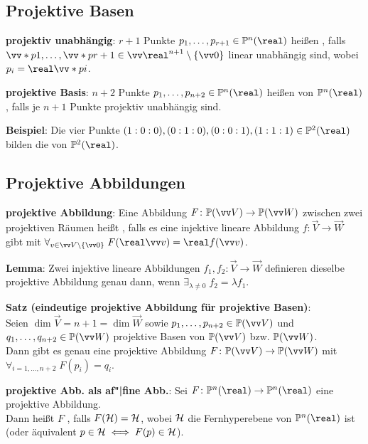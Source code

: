 \subsection{%
    Projektive Basen%
}

\textbf{projektiv unabhängig}:
$r+1$ Punkte $p_1, \dotsc, p_{r+1} \in \PP^n(\real)$ heißen , falls
$\vec*{p}{1}, \dotsc, \vec*{p}{r+1} \in \vec{\real}^{n+1} \setminus \{\vec{0}\}$ linear unabhängig
sind, wobei $p_i = \real\vec*{p}{i}$.

\textbf{projektive Basis}:
$n+2$ Punkte $p_1, \dotsc, p_{n+2} \in \PP^n(\real)$ heißen
von $\PP^n(\real)$, falls je $n+1$ Punkte projektiv unabhängig sind.

\textbf{Beispiel}:
Die vier Punkte $(1:0:0), (0:1:0), (0:0:1), (1:1:1) \in \PP^2(\real)$ bilden die
 von $\PP^2(\real)$.

\pagebreak

\subsection{%
    Projektive Abbildungen%
}

\textbf{projektive Abbildung}:
Eine Abbildung $F\colon \PP(\vec{V}) \to \PP(\vec{W})$ zwischen zwei projektiven Räumen heißt
, falls es eine injektive lineare Abbildung
$f\colon \vec{V} \to \vec{W}$ gibt mit
$\forall_{v \in \vec{V} \setminus \{\vec{0}\}}\; F(\real\vec{v}) = \real f(\vec{v})$.

\textbf{Lemma}:
Zwei injektive lineare Abbildungen $f_1, f_2\colon \vec{V} \to \vec{W}$ definieren dieselbe
projektive Abbildung genau dann, wenn $\exists_{\lambda\not=0}\; f_2 = \lambda f_1$.

\textbf{Satz (eindeutige projektive Abbildung für projektive Basen)}:\\
Seien $\dim \vec{V} = n + 1 = \dim \vec{W}$ sowie $p_1, \dotsc, p_{n+2} \in \PP(\vec{V})$ und
$q_1, \dotsc, q_{n+2} \in \PP(\vec{W})$ projektive Basen von $\PP(\vec{V})$ bzw. $\PP(\vec{W})$.\\
Dann gibt es genau eine projektive Abbildung $F\colon \PP(\vec{V}) \to \PP(\vec{W})$ mit
$\forall_{i = 1, \dotsc, n+2}\; F(p_i) = q_i$.

\linie

\textbf{projektive Abb. als af"|fine Abb.}:
Sei $F\colon \PP^n(\real) \to \PP^n(\real)$ eine projektive Abbildung.\\
Dann heißt $F$ , falls $F(\mathcal{H}) = \mathcal{H}$,
wobei $\mathcal{H}$ die Fernhyperebene von $\PP^n(\real)$ ist\\
(oder äquivalent $p \in \mathcal{H} \iff F(p) \in \mathcal{H}$).

